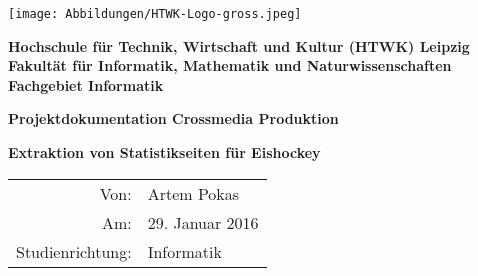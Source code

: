 \begin{titlepage}
\flushright
\texttt{[image: Abbildungen/HTWK-Logo-gross.jpeg]}
\vfill
\begin{center}
{\textbf {Hochschule f\"ur Technik, Wirtschaft und Kultur (HTWK) Leipzig\\Fakult\"at f\"ur Informatik, Mathematik und Naturwissenschaften\\Fachgebiet Informatik} \par}
\vskip 1cm
{\huge\textbf {Projektdokumentation Crossmedia Produktion} \par}
{\textbf {Extraktion von Statistikseiten f\"ur Eishockey}\par}
\end{center}
\vfill
\vskip 3cm
\flushleft
\begin{tabular}{rl}
Von: & {Artem Pokas}\\ 
Am: & 29. Januar 2016\\
Studienrichtung: & {Informatik}\\
\end{tabular}

   
\end{titlepage}
